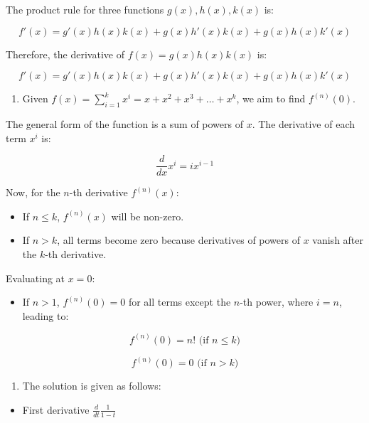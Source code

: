 \documentclass[
]{book}
\providecommand{\tightlist}{%
  \setlength{\itemsep}{0pt}\setlength{\parskip}{0pt}}
\begin{document}
The product rule for three functions \(g(x), h(x), k(x)\) is:

\[
f'(x) = g'(x)h(x)k(x) + g(x)h'(x)k(x) + g(x)h(x)k'(x)
\]

Therefore, the derivative of \(f(x) = g(x)h(x)k(x)\) is:

\[
f'(x) = g'(x)h(x)k(x) + g(x)h'(x)k(x) + g(x)h(x)k'(x)
\]

\begin{enumerate}
\def\labelenumi{\arabic{enumi}.}
\setcounter{enumi}{1}
\tightlist
\item
  Given \(f(x) = \sum_{i=1}^k x^i = x + x^2 + x^3 + \dots + x^k\), we
  aim to find \(f^{(n)}(0)\).
\end{enumerate}

The general form of the function is a sum of powers of \(x\). The
derivative of each term \(x^i\) is:

\[
\frac{d}{dx}x^i = ix^{i-1}
\]

Now, for the \(n\)-th derivative \(f^{(n)}(x)\):

\begin{itemize}
\tightlist
\item
  If \(n \leq k\), \(f^{(n)}(x)\) will be non-zero.
\item
  If \(n > k\), all terms become zero because derivatives of powers of
  \(x\) vanish after the \(k\)-th derivative.
\end{itemize}

Evaluating at \(x = 0\):

\begin{itemize}
\tightlist
\item
  If \(n > 1\), \(f^{(n)}(0) = 0\) for all terms except the \(n\)-th
  power, where \(i = n\), leading to:
\end{itemize}

\[
f^{(n)}(0) = n! \text{ (if } n \leq k \text{)}
\]

\[
f^{(n)}(0) = 0 \text{ (if } n > k \text{)}
\]

\begin{enumerate}
\def\labelenumi{\arabic{enumi}.}
\setcounter{enumi}{2}
\tightlist
\item
  The solution is given as follows:
\end{enumerate}

\begin{itemize}
\tightlist
\item
  First derivative \(\frac{d}{dt} \frac{1}{1-t}\)
\end{itemize}
\end{document}
